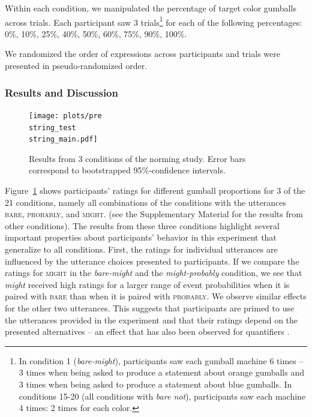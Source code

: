 \documentclass[lucida,biblatex]{sp} %
\begin{document}
\noindent Within each condition, we manipulated the percentage of target color gumballs across trials. 
Each participant saw 3 trials\footnote{In condition 1 (\textit{bare-might}), participants saw each gumball machine 6 times -- 3 times when being asked to produce a statement about orange gumballs and 3 times when being asked to produce a statement about blue gumballs. In conditions 15-20 (all conditions with \textit{bare not}), participants saw each machine 4 times: 2 times for each color.} 
for each of the following percentages: \\ 0\%, 10\%, 25\%, 40\%, 50\%, 60\%, 75\%, 90\%, 100\%.

\noindent We randomized the order of expressions across participants and trials were presented in pseudo-randomized order.


\subsubsection{Results and Discussion}

\begin{figure}
\texttt{[image: plots/pre\\string\_test\\string\_main.pdf]} 
\caption{Results from 3 conditions of the norming study. Error bars correspond to bootstrapped 95\%-confidence intervals. \label{fig:norming-results-main} }
\end{figure}

Figure~\ref{fig:norming-results-main} shows participants' ratings for different gumball proportions for 3 of the 21 conditions, namely all combinations of the conditions
with the utterances \textsc{bare}, \textsc{probably}, and \textsc{might}. 
(see the Supplementary Material for the results from other conditions). 
The results from these three conditions highlight several important properties about participants'
behavior in this experiment that generalize to all conditions.
First, the ratings for individual utterances are influenced by the utterance choices presented to participants.
If we compare the ratings for \textsc{might} in the \textit{bare-might} and the \textit{might-probably} condition, we see that \textit{might} received high ratings for a larger
range of event probabilities when it is paired with \textsc{bare} than when it is paired with \textsc{probably}. We observe similar effects for the other two utterances.
This suggests that participants are primed to use the utterances provided in the experiment and that their ratings depend on the presented alternatives -- an effect that
has also been observed for quantifiers \citep{DegenTanenhaus2015}.
\end{document}
